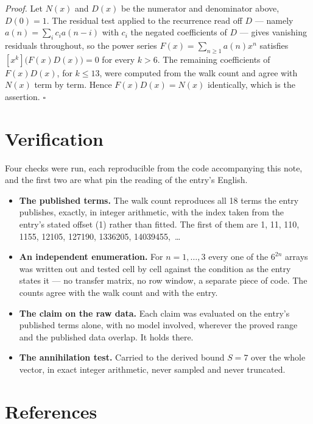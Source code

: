 \documentclass[11pt]{article}
\theoremstyle{definition}
\begin{document}
{\itshape Proof.} Let $N(x)$ and $D(x)$ be the numerator and denominator above, $D(0)=1$. The residual test applied to the recurrence read off $D$ --- namely $a(n) = \sum_i c_i a(n-i)$ with $c_i$ the negated coefficients of $D$ --- gives vanishing residuals throughout, so the power series $F(x)=\sum_{n\ge 1}a(n)x^n$ satisfies $[x^k]\bigl(F(x)D(x)\bigr) = 0$ for every $k > 6$. The remaining coefficients of $F(x)D(x)$, for $k \le 13$, were computed from the walk count and agree with $N(x)$ term by term. Hence $F(x)D(x) = N(x)$ identically, which is the assertion. $\square$

\section{Verification}

Four checks were run, each reproducible from the code accompanying this note, and the first two are what pin the reading of the entry's English.

\begin{itemize}

\item {\bfseries The published terms.} The walk count reproduces all 18 terms the entry publishes, exactly, in integer arithmetic, with the index taken from the entry's stated offset (1) rather than fitted. The first of them are 1, 11, 110, 1155, 12105, 127190, 1336205, 14039455,~\dots

\item {\bfseries An independent enumeration.} For $n = 1,\dots,3$ every one of the $6^{2n}$ arrays was written out and tested cell by cell against the condition as the entry states it --- no transfer matrix, no row window, a separate piece of code. The counts agree with the walk count and with the entry.

\item {\bfseries The claim on the raw data.} Each claim was evaluated on the entry's published terms alone, with no model involved, wherever the proved range and the published data overlap. It holds there.

\item {\bfseries The annihilation test.} Carried to the derived bound $S = 7$ over the whole vector, in exact integer arithmetic, never sampled and never truncated.

\end{itemize}

\section{References}
\end{document}
